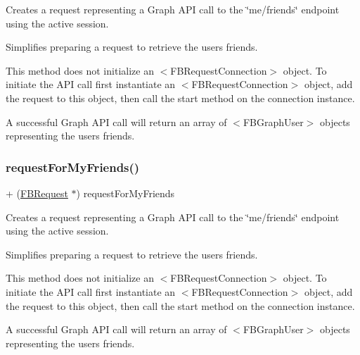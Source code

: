 Creates a request representing a Graph A\+PI call to the \char`\"{}me/friends\char`\"{} endpoint using the active session.

Simplifies preparing a request to retrieve the user\textquotesingle{}s friends.

This method does not initialize an $<$\+F\+B\+Request\+Connection$>$ object. To initiate the A\+PI call first instantiate an $<$\+F\+B\+Request\+Connection$>$ object, add the request to this object, then call the {\ttfamily start} method on the connection instance.

A successful Graph A\+PI call will return an array of $<$\+F\+B\+Graph\+User$>$ objects representing the user\textquotesingle{}s friends. \mbox{\label{interfaceFBRequest_a95570ea8628f71b3c311da8378729cc6}} 
\subsubsection{\texorpdfstring{request\+For\+My\+Friends()}{requestForMyFriends()}\hspace{0.1cm}{\footnotesize\ttfamily [2/5]}}
{\footnotesize\ttfamily + (\hyperlink{interfaceFBRequest}{F\+B\+Request} $\ast$) request\+For\+My\+Friends \begin{DoxyParamCaption}{ }\end{DoxyParamCaption}}

Creates a request representing a Graph A\+PI call to the \char`\"{}me/friends\char`\"{} endpoint using the active session.

Simplifies preparing a request to retrieve the user\textquotesingle{}s friends.

This method does not initialize an $<$\+F\+B\+Request\+Connection$>$ object. To initiate the A\+PI call first instantiate an $<$\+F\+B\+Request\+Connection$>$ object, add the request to this object, then call the {\ttfamily start} method on the connection instance.

A successful Graph A\+PI call will return an array of $<$\+F\+B\+Graph\+User$>$ objects representing the user\textquotesingle{}s friends. \mbox{\label{interfaceFBRequest_a95570ea8628f71b3c311da8378729cc6}} 
